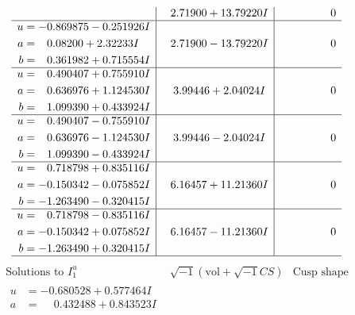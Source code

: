 \documentclass[1p]{elsarticle_modified}
\theoremstyle{definition}
\newcommand{\I}{\sqrt{-1}}
\begin{document}
$$\begin{array}{c|c|c}
 & \phantom{-}2.71900 + 13.79220 I & \phantom{-0.000000 } 0 \\ \hline\begin{aligned}
u &= -0.869875 - 0.251926 I \\
a &= \phantom{-}0.08200 + 2.32233 I \\
b &= \phantom{-}0.361982 + 0.715554 I\end{aligned}
 & \phantom{-}2.71900 - 13.79220 I & \phantom{-0.000000 } 0 \\ \hline\begin{aligned}
u &= \phantom{-}0.490407 + 0.755910 I \\
a &= \phantom{-}0.636976 + 1.124530 I \\
b &= \phantom{-}1.099390 + 0.433924 I\end{aligned}
 & \phantom{-}3.99446 + 2.04024 I & \phantom{-0.000000 } 0 \\ \hline\begin{aligned}
u &= \phantom{-}0.490407 - 0.755910 I \\
a &= \phantom{-}0.636976 - 1.124530 I \\
b &= \phantom{-}1.099390 - 0.433924 I\end{aligned}
 & \phantom{-}3.99446 - 2.04024 I & \phantom{-0.000000 } 0 \\ \hline\begin{aligned}
u &= \phantom{-}0.718798 + 0.835116 I \\
a &= -0.150342 - 0.075852 I \\
b &= -1.263490 - 0.320415 I\end{aligned}
 & \phantom{-}6.16457 + 11.21360 I & \phantom{-0.000000 } 0 \\ \hline\begin{aligned}
u &= \phantom{-}0.718798 - 0.835116 I \\
a &= -0.150342 + 0.075852 I \\
b &= -1.263490 + 0.320415 I\end{aligned}
 & \phantom{-}6.16457 - 11.21360 I & \phantom{-0.000000 } 0\\
 \hline 
 \end{array}$$\newpage$$\begin{array}{c|c|c}  
\text{Solutions to }I^u_{1}& \I (\text{vol} + \sqrt{-1}CS) & \text{Cusp shape}\\
 \hline 
\begin{aligned}
u &= -0.680528 + 0.577464 I \\
a &= \phantom{-}0.432488 + 0.843523 I \\

\end{aligned}
\end{array}$$
\end{document}
